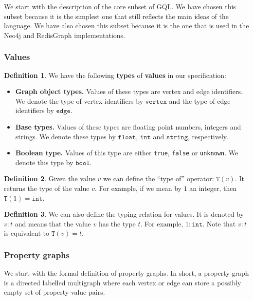 \documentclass[14pt]{constructor-thesis}
\theoremstyle{definition}
\newtheorem*{definition}{Definition}
\begin{document}
We start with the description of the core subset of GQL. We have chosen this subset because it is the simplest one that still reflects the main ideas of the language. We have also chosen this subset because it is the one that is used in the Neo4j and RedisGraph implementations.

\subsubsection{Values}

\begin{definition}
  We have the following \textbf{types} of \textbf{values} in our specification:
  \begin{itemize}
    \item \textbf{Graph object types.} Values of these types are vertex and edge identifiers. We denote the type of vertex identifiers by $\mathtt{vertex}$ and the type of edge identifiers by $\mathtt{edge}$.
    \item \textbf{Base types.} Values of these types are floating point numbers, integers and strings. We denote these types by $\mathtt{float}$, $\mathtt{int}$ and $\mathtt{string}$, respectively.
    \item \textbf{Boolean type.} Values of this type are either \texttt{true}, \texttt{false} or \texttt{unknown}. We denote this type by $\mathtt{bool}$.
  \end{itemize}
\end{definition}

\begin{definition}
  Given the value $v$ we can define the ``type of'' operator: $\mathtt{T}(v)$. It returns the type of the value $v$. For example, if we mean by $1$ an integer, then $\mathtt{T}(1) = \mathtt{int}$.
\end{definition}

\begin{definition}
  We can also define the typing relation for values. It is denoted by $v : t$ and means that the value $v$ has the type $t$. For example, $1 : \mathtt{int}$. Note that $v : t$ is equivalent to $\mathtt{T}(v) = t$.
\end{definition}

\subsubsection{Property graphs}

We start with the formal definition of property graphs. In short, a property graph is a directed labelled multigraph where each vertex or edge can store a possibly empty set of property-value pairs. 
\end{document}
